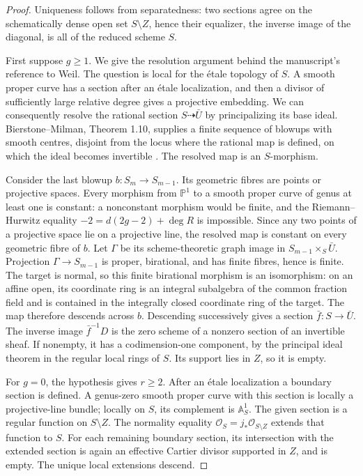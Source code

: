 \begin{proof}
Uniqueness follows from separatedness: two sections agree on the schematically
dense open set $S\setminus Z$, hence their equalizer, the inverse image of the
diagonal, is all of the reduced scheme $S$.

First suppose $g\geq1$. We give the resolution argument behind the manuscript's
reference to Weil. The question is local for the \'etale topology of $S$.
A smooth proper curve has a section after an \'etale localization, and then
a divisor of sufficiently large relative degree gives a projective embedding.
We can consequently resolve the rational section $S\dashrightarrow\bar U$
by principalizing its base ideal. Bierstone--Milman, Theorem 1.10, supplies
a finite sequence of blowups with smooth centres, disjoint from the locus
where the rational map is defined, on which the ideal becomes invertible
\cite{CF_BierstoneMilman1997}. The resolved map is an $S$-morphism.

Consider the last blowup $b:S_m\to S_{m-1}$. Its geometric fibres are points
or projective spaces. Every morphism from $\mathbb P^1$ to a smooth proper
curve of genus at least one is constant: a nonconstant morphism would be
finite, and the Riemann--Hurwitz equality
$-2=d(2g-2)+\deg R$ is impossible. Since any two points of a projective
space lie on a projective line, the resolved map is constant on every
geometric fibre of $b$. Let $\Gamma$ be its scheme-theoretic graph image in
$S_{m-1}\times_S\bar U$. Projection $\Gamma\to S_{m-1}$ is proper,
birational, and has finite fibres, hence is finite. The target is normal,
so this finite birational morphism is an isomorphism: on an affine open,
its coordinate ring is an integral subalgebra of the common fraction field
and is contained in the integrally closed coordinate ring of the target.
The map therefore descends across $b$. Descending successively gives a
section $\bar f:S\to\bar U$. The inverse image $\bar f^{-1}D$ is the zero
scheme of a nonzero section of an invertible sheaf. If nonempty, it has a
codimension-one component, by the principal ideal theorem in the regular
local rings of $S$. Its support lies in $Z$, so it is empty.

For $g=0$, the hypothesis gives $r\geq2$. After an \'etale localization a
boundary section is defined. A genus-zero smooth proper curve with this
section is locally a projective-line bundle; locally on $S$, its complement
is $\mathbb A^1_S$. The given section is a regular function on $S\setminus Z$.
The normality equality
$\mathcal O_S=j_*\mathcal O_{S\setminus Z}$ extends that function to $S$.
For each remaining boundary section, its intersection with the extended
section is again an effective Cartier divisor supported in $Z$, and is empty.
The unique local extensions descend.


\end{proof}
